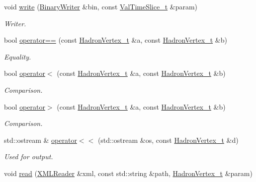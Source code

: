 \begin{DoxyCompactItemize}
void \mbox{\hyperlink{namespaceHadron_a7b503b82bc88cdec19d5b7173957b35e}{write}} (\mbox{\hyperlink{classADATIO_1_1BinaryWriter}{Binary\+Writer}} \&bin, const \mbox{\hyperlink{structHadron_1_1ValTimeSlice__t}{Val\+Time\+Slice\+\_\+t}} \&param)
\begin{DoxyCompactList}\small\item\em Writer. \end{DoxyCompactList}\item 
bool \mbox{\hyperlink{namespaceHadron_af09f672981980cb11de931b95576f828}{operator==}} (const \mbox{\hyperlink{structHadron_1_1HadronVertex__t}{Hadron\+Vertex\+\_\+t}} \&a, const \mbox{\hyperlink{structHadron_1_1HadronVertex__t}{Hadron\+Vertex\+\_\+t}} \&b)
\begin{DoxyCompactList}\small\item\em Equality. \end{DoxyCompactList}\item 
bool \mbox{\hyperlink{namespaceHadron_a43c37405dc872b3d2d1f477ca914424a}{operator$<$}} (const \mbox{\hyperlink{structHadron_1_1HadronVertex__t}{Hadron\+Vertex\+\_\+t}} \&a, const \mbox{\hyperlink{structHadron_1_1HadronVertex__t}{Hadron\+Vertex\+\_\+t}} \&b)
\begin{DoxyCompactList}\small\item\em Comparison. \end{DoxyCompactList}\item 
bool \mbox{\hyperlink{namespaceHadron_a341b896434c5621c127ef5066c50c7f0}{operator$>$}} (const \mbox{\hyperlink{structHadron_1_1HadronVertex__t}{Hadron\+Vertex\+\_\+t}} \&a, const \mbox{\hyperlink{structHadron_1_1HadronVertex__t}{Hadron\+Vertex\+\_\+t}} \&b)
\begin{DoxyCompactList}\small\item\em Comparison. \end{DoxyCompactList}\item 
std\+::ostream \& \mbox{\hyperlink{namespaceHadron_ac4fad3eded4cdc1e5e3a20c089ff92c7}{operator$<$$<$}} (std\+::ostream \&os, const \mbox{\hyperlink{structHadron_1_1HadronVertex__t}{Hadron\+Vertex\+\_\+t}} \&d)
\begin{DoxyCompactList}\small\item\em Used for output. \end{DoxyCompactList}\item 
void \mbox{\hyperlink{namespaceHadron_a83c06845cd19520623de3b0074b9d25c}{read}} (\mbox{\hyperlink{classADATXML_1_1XMLReader}{X\+M\+L\+Reader}} \&xml, const std\+::string \&path, \mbox{\hyperlink{structHadron_1_1HadronVertex__t}{Hadron\+Vertex\+\_\+t}} \&param)

\end{DoxyCompactItemize}
